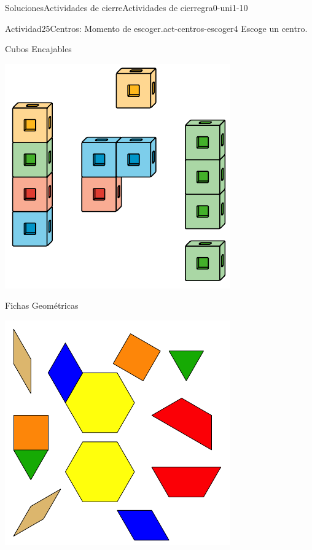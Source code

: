 \documentclass[twoside,10pt,]{article}
\begin{document}
\begin{solutions-section}{Soluciones}{Actividades de cierre}{}{Actividades de cierre}{}{}{gra0-uni1-10}
\begin{activitysolution}{Actividad}{25}{Centros: Momento de escoger.}{act-centros-escoger4}
Escoge un centro.%
\begin{sidebyside}{2}{0.025}{0.025}{0.05}%
\begin{sbspanel}{0.45}%
Cubos Encajables%
\par
\includegraphics[width=\linewidth]{external/svg-source/tikz-file-128850.pdf}
\end{sbspanel}%
\begin{sbspanel}{0.45}%
Fichas Geométricas%
\par
\includegraphics[width=\linewidth]{external/svg-source/tikz-file-147344.pdf}

\end{sbspanel}
\end{sidebyside}
\end{activitysolution}
\end{solutions-section}
\end{document}
